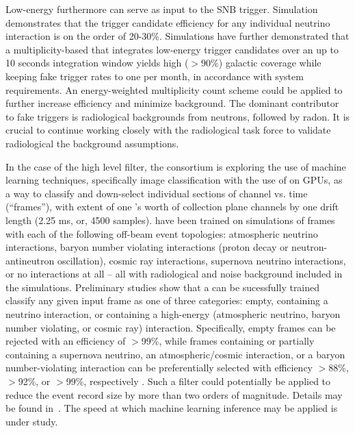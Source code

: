 Low-energy  furthermore can serve as input to the
SNB trigger. Simulation demonstrates that the trigger candidate
efficiency for any individual  neutrino interaction is on the order
of 20-30\%. Simulations have further demonstrated that a
multiplicity-based   that integrates low-energy
trigger candidates over an up to 10 seconds
integration window yields high ($>90$\%) galactic coverage while
keeping fake  trigger rates to one per month, in accordance with system
requirements. An energy-weighted multiplicity count scheme could be
applied to further increase efficiency and minimize background.
The dominant contributor to fake  triggers is
radiological backgrounds from neutrons, followed by radon. It is
crucial to continue working closely with the radiological task force
to validate radiological the background assumptions.

In the case of the high level filter, the consortium is exploring the
use of machine learning techniques, specifically image classification
with the use of  on GPUs, as a way to
classify and down-select individual sections of  channel vs. time
(``frames''), with extent of one 's worth of collection plane
channels by one drift length (2.25 ms, or, 4500 samples).  have
been trained on  simulations of frames with each of
the following off-beam event topologies: 
atmospheric neutrino interactions, baryon number violating
interactions (proton decay or neutron-antineutron oscillation), cosmic
ray interactions, supernova neutrino interactions, or no interactions at all -- all
with radiological and noise background included in the
simulations. Preliminary studies show that a  can be sucessfully trained classify any
given input frame as one of three categories: empty, containing a  neutrino
interaction, or containing a high-energy (atmospheric neutrino, baryon
number violating, or cosmic ray) interaction. Specifically, empty frames can be
rejected with an efficiency of $>$99\%, while frames containing or
partially containing 
a supernova neutrino, an atmospheric/cosmic interaction, or a baryon
number-violating interaction can be preferentially selected with efficiency
$>$88\%, $>$92\%, or $>$99\%, respectively  \cite{bib:docdb11311}. Such a 
filter could potentially be applied to reduce the event record size by
more than two orders of magnitude. Details may be found in~.
The speed at which machine learning inference may be applied is under study.


